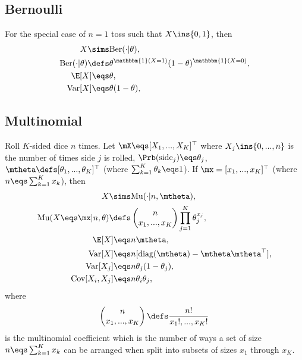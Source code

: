 \documentclass[11pt,a4paper]{report}
\begin{document}
\subsection{Bernoulli}
For the special case of $n=1$ toss such that $X\ins\{0,1\}$, then
\begin{align*}
	X\sims&\text{Ber}(\cdot|\theta),\\
	\text{Ber}(\cdot|\theta)\defs&\theta^{\mathbbm{1}(X=1)}(1-\theta)^{\mathbbm{1}(X=0)},\\
	\E[X]\eqs&\theta,\\
	\text{Var}[X]\eqs&\theta(1-\theta),
\end{align*}

\subsection{Multinomial}
Roll $K$-sided dice $n$ times. Let $\mX\eqs [X_{1},...,X_{K}]^{\top}$ where $X_{j}\ins\{0,...,n\}$ is the number of times side $j$ is rolled, $\Prb(\text{side}_{j})\eqs\theta_{j}$, $\mtheta\defs [\theta_{1},...,\theta_{K}]^{\top}$ (where $\sum_{k=1}^{K}\theta_{k}\eqs 1$). If $\mx=[x_{1},...,x_{K}]^{\top}$ (where $n\eqs \sum_{k=1}^{K}x_{k}$), then
\begin{align*}
	X\sims&\text{Mu}(\cdot|n,\mtheta),\\
	\text{Mu}(X\eqs \mx|n,\theta)\defs&\begin{pmatrix} n\\x_{1},...,x_{K} \end{pmatrix}\prod_{j=1}^{K}\theta_{j}^{x_{j}},\\
	\E[X]\eqs&n\mtheta,\\	
    \text{Var}[X]\eqs& n[\text{diag}(\mtheta)-\mtheta\mtheta^{\top}],\\
	\text{Var}[X_{j}]\eqs&n\theta_{j}(1-\theta_{j}),\\
	\text{Cov}[X_{i},X_{j}]\eqs&n\theta_{i}\theta_{j},
\end{align*}
where 
\begin{align*}
	\begin{pmatrix} n\\x_{1},...,x_{K} \end{pmatrix}\defs\frac{n!}{x_{1}!,...,x_{K}!}
\end{align*}
is the multinomial coefficient which is the number of ways a set of size $n\eqs \sum_{k=1}^{K}x_{k}$ can be arranged when split into subsets of sizes $x_{1}$ through $x_{K}$.
\end{document}
